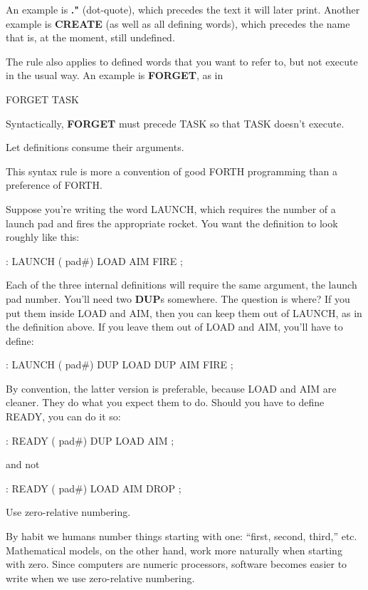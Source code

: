 An example is \textbf{."} (dot-quote), which precedes the text it will later
print. Another example is \textbf{CREATE} (as well as all defining words), which
precedes the name that is, at the moment, still undefined.

The rule also applies to defined words that you want to refer to, but
not execute in the usual way. An example is \textbf{FORGET}, as in

\begin{Code}
FORGET TASK
\end{Code}

Syntactically, \textbf{FORGET} must precede TASK so that TASK doesn't
execute.
\begin{tip}
Let definitions consume their arguments.
\end{tip}
This syntax rule is more a convention of good FORTH programming
than a preference of FORTH.

Suppose you're writing the word LAUNCH, which requires the
number of a launch pad and fires the appropriate rocket. You want the
definition to look roughly like this:
\begin{Code}
: LAUNCH  ( pad#)  LOAD  AIM  FIRE ;
\end{Code}
Each of the three internal definitions will require the same argument, the
launch pad number. You'll need two \textbf{DUP}s somewhere. The question is
where? If you put them inside LOAD and AIM, then you can keep them
out of LAUNCH, as in the definition above. If you leave them out of
LOAD and AIM, you'll have to define:
\begin{Code}
: LAUNCH  ( pad#)  DUP LOAD  DUP AIM  FIRE ;
\end{Code}
By convention, the latter version is preferable, because LOAD and AIM
are cleaner. They do what you expect them to do. Should you have to
define READY, you can do it so:
\begin{Code}
: READY  ( pad#)  DUP LOAD  AIM ;
\end{Code}
and not
\begin{Code}
: READY  ( pad#)  LOAD  AIM  DROP ;
\end{Code}
\begin{tip}
Use zero-relative numbering.
\end{tip}
By habit we humans number things starting with one: ``first, second,
third,'' etc. Mathematical models, on the other hand, work more naturally
when starting with zero. Since computers are numeric processors, software
becomes easier to write when we use zero-relative numbering.

